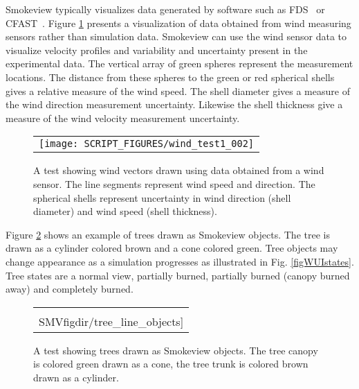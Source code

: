 Smokeview typically visualizes data generated by software such as
FDS~\cite{FDS_Tech_Guide} or CFAST~\cite{CFAST_Tech_Guide_6}.
Figure \ref{figwind} presents a visualization
of data obtained from wind measuring sensors rather than simulation data.
Smokeview can use the wind sensor data to visualize velocity profiles and
variability and uncertainty present in the experimental data.
The vertical array of green spheres represent the measurement locations.
The distance from these spheres to the green or red spherical shells
gives a relative measure of the wind speed.  The shell diameter gives
a measure of the wind direction measurement uncertainty. Likewise the
shell thickness give a measure of the wind velocity measurement uncertainty.

\begin{figure}[bph]
\begin{center}
\begin{tabular}{c}
 \texttt{[image: SCRIPT\_FIGURES/wind\_test1\_002]}
 \end{tabular}
\end{center}
 \caption[A test showing wind vectors drawn using data obtained
 from a wind sensor.]{A test showing wind vectors drawn using
 data obtained from a wind sensor. The line segments represent
 wind speed and direction.  The spherical shells represent uncertainty
 in wind direction (shell diameter) and wind speed (shell thickness).}
\label{figwind}%
\end{figure}
\npage

Figure \ref{figWUItrees} shows an
example of trees drawn as Smokeview objects.  The tree is drawn
as a cylinder colored brown and a cone colored green.  Tree objects
may change appearance as a simulation progresses as illustrated in
Fig. \ref{figWUIstates}. Tree states are a normal view, partially
burned, partially burned (canopy burned away) and completely burned.

\begin{figure}[bph]
\begin{center}
\begin{tabular}{c}
 \texttt{[image: \\SMVfigdir/tree\_line\_objects]}\\
 \end{tabular}
\end{center}
 \caption[A test showing trees drawn as Smokeview objects.]{A test
 showing trees drawn as Smokeview objects.  The tree canopy is
 colored green drawn as a cone,  the tree trunk is colored brown
 drawn as a cylinder.}
\label{figWUItrees}%
\end{figure}

